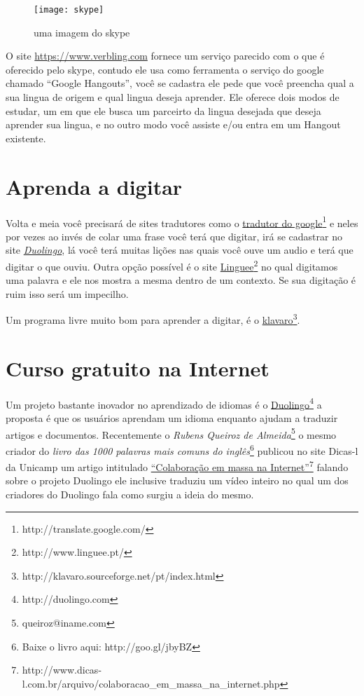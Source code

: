 \begin{figure}[h!]
	\centering
	\texttt{[image: skype]}
	\caption{uma imagem do skype}
\end{figure}

\noindent
O site \href{https://www.verbling.com}{https://www.verbling.com} fornece um serviço parecido com o que é oferecido
pelo skype, contudo ele usa como ferramenta o serviço do google
chamado ``Google Hangouts'', você se cadastra ele pede que você
preencha qual a sua lingua de origem e qual lingua deseja aprender.
Ele oferece dois modos de estudar, um em que ele busca um parceirto da
lingua desejada que deseja aprender sua lingua, e no outro modo você
assiste e/ou entra em um Hangout existente.

\section{Aprenda a digitar}

Volta e meia você precisará de sites tradutores como
o \href{http://translate.google.com}{tradutor do
google}\footnote{http://translate.google.com/} e neles por vezes ao invés de
colar uma frase você terá que digitar, irá se cadastrar no site {\em \href{http://duolingo.com}{Duolingo}},
lá você terá muitas lições nas quais você ouve um audio e terá que digitar
o que ouviu. Outra opção possível é o site
\href{http://www.lingue.pt/}{Linguee}\footnote{http://www.linguee.pt/} no qual
digitamos uma palavra e ele nos mostra a mesma dentro de um contexto.  Se sua
digitação é ruim isso será um impecilho.

\vspace{0.3\baselineskip}
\noindent
{\footnotesize {}  Um programa livre muito bom para aprender a digitar,
é o \href{http://klavaro.sourceforge.net/pt/index.html}{klavaro}\footnote{http://klavaro.sourceforge.net/pt/index.html}.}

\section{Curso gratuito na Internet}

Um projeto bastante inovador no aprendizado de idiomas é o 
\href{http://duolingo.com}{Duolingo}\footnote{http://duolingo.com} a proposta
é que os usuários aprendam um idioma enquanto ajudam a traduzir artigos
e documentos. Recentemente o {\em Rubens Queiroz de Almeida}\footnote{queiroz@iname.com} o mesmo criador do
{\em livro das 1000 palavras mais comuns do inglês}\footnote{Baixe o livro aqui: http://goo.gl/jbyBZ} publicou no site
Dicas-l da Unicamp um artigo intitulado \href{http://www.dicas-l.com.br/arquivo/colaboracao\_em\_massa\_na\_internet.php}{``Colaboração
em massa na Internet''}\footnote{http://www.dicas-l.com.br/arquivo/colaboracao\_em\_massa\_na\_internet.php}
 falando sobre o projeto Duolingo ele inclusive traduziu um vídeo inteiro no qual um dos criadores
do Duolingo fala como surgiu a ideia do mesmo.

